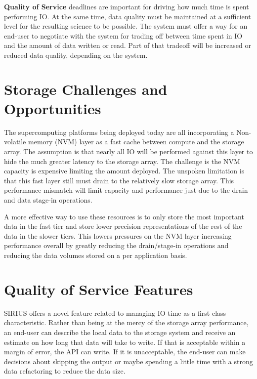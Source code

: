 \documentclass{sig-alt-gov2}
\begin{document}
\noindent\textbf{Quality of Service} deadlines are important for driving how
much time is spent performing IO. At the same time, data quality must be
maintained at a sufficient level for the resulting science to be possible.
The system must offer a way for an end-user to negotiate with the system for
trading off between time spent in IO and the amount of data written or read.
Part of that tradeoff will be increased or reduced data quality, depending on
the system.

\section{Storage Challenges and Opportunities}
\label{sec:storage}

The supercomputing platforms being deployed today are all incorporating a
Non-volatile memory (NVM) layer as a fast cache between compute and the storage
array. The assumption is that nearly all IO will be performed against this
layer to hide the much greater latency to the storage array. The challenge is
the NVM capacity is expensive limiting the amount deployed. The unspoken
limitation is that this fast layer still must drain to the relatively slow
storage array. This performance mismatch will limit capacity and performance
just due to the drain and data stage-in operations.

A more effective way to use these resources is to only store the most
important data in the fast tier and store lower precision representations of
the rest of the data in the slower tiers. This lowers pressures on the NVM
layer increasing performance overall by greatly reducing the drain/stage-in
operations and reducing the data volumes stored on a per application basis.

\section{Quality of Service Features}
\label{sec:qos}

SIRIUS offers a novel feature related to managing IO time as a first class
characteristic. Rather than being at the mercy of the storage array
performance, an end-user can describe the local data to the storage system and
receive an estimate on how long that data will take to write. If that is
acceptable within a margin of error, the API can write. If it is unacceptable,
the end-user can make decisions about skipping the output or maybe spending a
little time with a strong data refactoring to reduce the data size.
\end{document}

